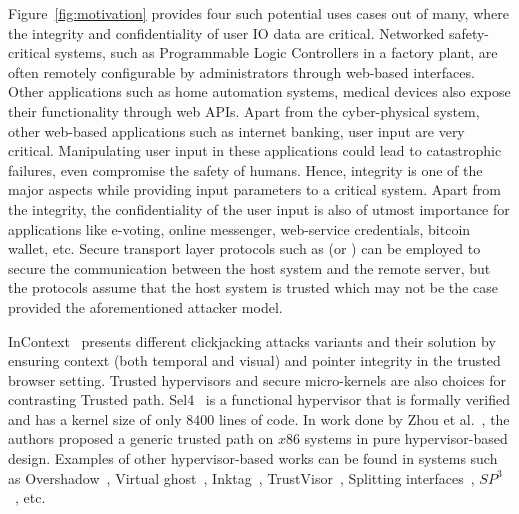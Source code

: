 Figure~\ref{fig:motivation} provides four such potential uses cases out of many, where the integrity and confidentiality of user IO data are critical. Networked safety-critical systems, such as Programmable Logic Controllers in a factory plant, are often remotely configurable by administrators through web-based interfaces. Other applications such as home automation systems, medical devices also expose their functionality through web APIs. Apart from the cyber-physical system, other web-based applications such as internet banking, user input are very critical. Manipulating user input in these applications could lead to catastrophic failures, even compromise the safety of humans. Hence, integrity is one of the major aspects while providing input parameters to a critical system. Apart from the integrity, the confidentiality of the user input is also of utmost importance for applications like e-voting, online messenger, web-service credentials, bitcoin wallet, etc. Secure transport layer protocols such as \https (or \tls) can be employed to secure the communication between the host system and the remote server, but the protocols assume that the host system is trusted which may not be the case provided the aforementioned attacker model.

InContext~\cite{huang2012clickjacking} presents different clickjacking attacks variants and their solution by ensuring context (both temporal and visual) and pointer integrity in the trusted browser setting. Trusted hypervisors and secure micro-kernels are also choices for contrasting Trusted path. Sel4~\cite{klein2009sel4} is a functional hypervisor that is formally verified and has a kernel size of only $8400$ lines of code. In work done by Zhou et al.~\cite{zhou2012building}, the authors proposed a generic trusted path on $x86$ systems in pure hypervisor-based design. Examples of other hypervisor-based works can be found in systems such as Overshadow~\cite{Overshadow}, Virtual ghost~\cite{criswell2014virtual}, Inktag~\cite{hofmann2013inktag}, TrustVisor~\cite{mccune2010trustvisor}, Splitting interfaces~\cite{ta2006splitting}, $SP^3$~\cite{yang2008using}, etc.



